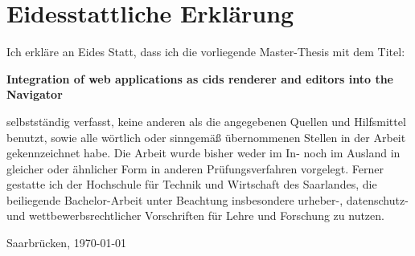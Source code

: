 \chapter*{Eidesstattliche Erklärung}

Ich erkläre an Eides Statt, dass ich die vorliegende Master-Thesis mit dem Titel:

\hspace{1.0cm}

{  \bfseries Integration of web applications as cids renderer and editors into the Navigator }

\hspace{1.0cm}

selbstständig verfasst, keine anderen als die angegebenen Quellen und Hilfsmittel
benutzt, sowie alle wörtlich oder sinngemäß übernommenen Stellen in der Arbeit
gekennzeichnet habe. Die Arbeit wurde bisher weder im In- noch im Ausland in
gleicher oder ähnlicher Form in anderen Prüfungsverfahren vorgelegt. Ferner gestatte
ich der Hochschule für Technik und Wirtschaft des Saarlandes, die beiliegende
Bachelor-Arbeit unter Beachtung insbesondere urheber-, datenschutz- und
wettbewerbsrechtlicher Vorschriften für Lehre und Forschung zu nutzen.


\vfill

{\large Saarbrücken, { \today}}

